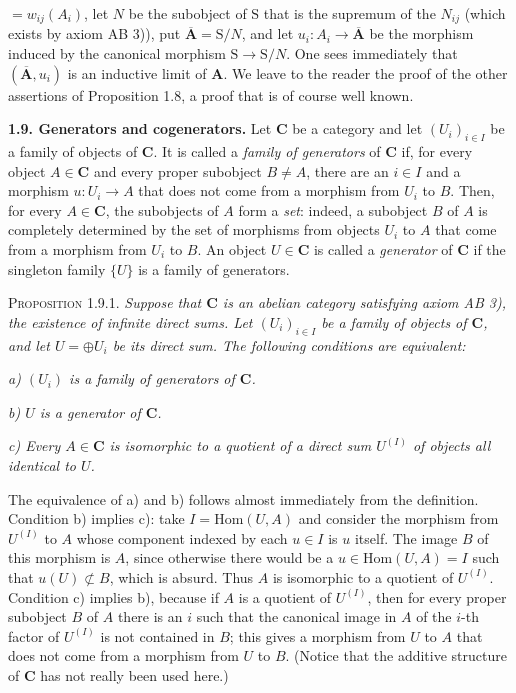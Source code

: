 
\noindent $=w_{ij}(A_i)$, let $N$ be the subobject of $\mathrm{S}$ that is the supremum
of the $N_{ij}$ (which exists by axiom AB 3)), put $\overline{\mathbf A}=\mathrm{S}/N$, and let
$u_i:A_i\to\overline{\mathbf A}$ be the morphism induced by the canonical
morphism $\mathrm{S}\to \mathrm{S}/N$. One sees immediately that
$(\overline{\mathbf A},u_i)$ is an inductive limit of $\mathbf A$. We leave to the
reader the proof of the other assertions of Proposition 1.8, a proof that is
of course well known.

\textbf{1.9. Generators and cogenerators.} Let $\mathbf{C}$ be a category and
let $(U_i)_{i\in I}$ be a family of objects of $\mathbf{C}$. It is called a
\textit{family of generators} of $\mathbf{C}$ if, for every object $A\in \mathbf{C}$ and every
proper subobject $B\neq A$, there are an $i\in I$ and a morphism
$u:U_i\to A$ that does not come from a morphism from $U_i$ to
$B$. Then, for every $A\in \mathbf{C}$, the subobjects of $A$ form a \textit{set}:
indeed, a subobject $B$ of $A$ is completely determined by the set of
morphisms from objects $U_i$ to $A$ that come from a morphism from $U_i$ to
$B$. An object $U\in \mathbf{C}$ is called a \textit{generator} of $\mathbf{C}$ if the singleton
family $\{U\}$ is a family of generators.

\textsc{Proposition 1.9.1.} \textit{Suppose that $\mathbf{C}$ is an
abelian category satisfying axiom \textup{AB 3)}, the existence of infinite direct
sums. Let $(U_i)_{i\in I}$ be a family of objects of $\mathbf{C}$, and let
$U=\oplus U_i$ be its direct sum. The following conditions are equivalent:}

\textit{a) $(U_i)$ is a family of generators of $\mathbf{C}$.}

\textit{b) $U$ is a generator of $\mathbf{C}$.}

\textit{c) Every $A\in \mathbf{C}$ is isomorphic to a quotient of a direct sum
$U^{(I)}$ of objects all identical to $U$.}

The equivalence of a) and b) follows almost immediately from the definition.
Condition b) implies c): take $I=\mathrm{Hom}(U,A)$ and consider the morphism
from $U^{(I)}$ to $A$ whose component indexed by each $u\in I$ is $u$ itself.
The image $B$ of this morphism is $A$, since otherwise there would be a
$u\in\mathrm{Hom}(U,A)=I$ such that $u(U)\not\subset B$, which is absurd.
Thus $A$ is isomorphic to a quotient of $U^{(I)}$. Condition c) implies b),
because if $A$ is a quotient of $U^{(I)}$, then for every proper subobject
$B$ of $A$ there is an $i$ such that the canonical image in $A$ of the
$i$-th factor of $U^{(I)}$ is not contained in $B$; this gives a morphism from
$U$ to $A$ that does not come from a morphism from $U$ to $B$. (Notice that
the additive structure of $\mathbf{C}$ has not really been used here.)

